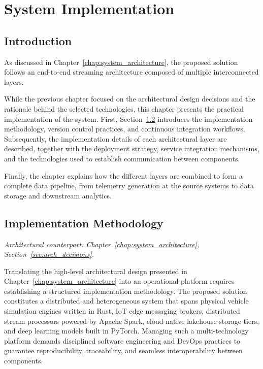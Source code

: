 \chapter{System Implementation}
\label{chap:system_implementation}

\section{Introduction}
\label{sec:system_implementation_intro}
As discussed in Chapter~\ref{chap:system_architecture}, the proposed solution follows an end-to-end streaming architecture composed of multiple interconnected layers. 

While the previous chapter focused on the architectural design decisions and the rationale behind the selected technologies, this chapter presents the practical implementation of the system. First, Section~\ref{sec:implementation_methodology} introduces the implementation methodology, version control practices, and continuous integration workflows. Subsequently, the implementation details of each architectural layer are described, together with the deployment strategy, service integration mechanisms, and the technologies used to establish communication between components. 

Finally, the chapter explains how the different layers are combined to form a complete data pipeline, from telemetry generation at the source systems to data storage and downstream analytics.

\section{Implementation Methodology}
\label{sec:implementation_methodology}
\textit{Architectural counterpart: Chapter~\ref{chap:system_architecture}, Section~\ref{sec:arch_decisions}.}

Translating the high-level architectural design presented in Chapter~\ref{chap:system_architecture} into an operational platform requires establishing a structured implementation methodology. The proposed solution constitutes a distributed and heterogeneous system that spans physical vehicle simulation engines written in Rust, IoT edge messaging brokers, distributed stream processors powered by Apache Spark, cloud-native lakehouse storage tiers, and deep learning models built in PyTorch. Managing such a multi-technology platform demands disciplined software engineering and DevOps practices to guarantee reproducibility, traceability, and seamless interoperability between components.

